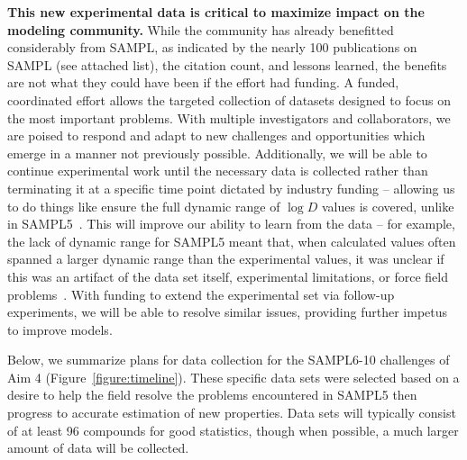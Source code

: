 \documentclass[11pt]{article}
\begin{document}
\textbf{This new experimental data is critical to maximize impact on the modeling community.} 
While the community has already benefitted considerably from SAMPL, as indicated by the nearly 100 publications on SAMPL (see attached list), the citation count, and lessons learned, the benefits are not what they could have been if the effort had funding.
A funded, coordinated effort allows the targeted collection of datasets designed to focus on the most important problems. 
With multiple investigators and collaborators, we are poised to respond and adapt to new challenges and opportunities which emerge in a manner not previously possible.
Additionally, we will be able to continue experimental work until the necessary data is collected rather than terminating it at a specific time point dictated by industry funding -- allowing us to do things like ensure the full dynamic range of $\log D$ values is covered, unlike in SAMPL5~\cite{rustenburg_measuring_2016, bannan_blind_2016}.
This will improve our ability to learn from the data -- for example, the lack of dynamic range for SAMPL5 meant that, when calculated values often spanned a larger dynamic range than the experimental values, it was unclear if this was an artifact of the data set itself, experimental limitations, or force field problems~\cite{rustenburg_measuring_2016, bannan_blind_2016, paranahewage_predicting_2016, klamt_prediction_2016}. 
With funding to extend the experimental set via follow-up experiments, we will be able to resolve similar issues, providing further impetus to improve models.


Below, we summarize plans for data collection for the SAMPL6-10 challenges of Aim 4 (Figure~\ref{figure:timeline}).
These specific data sets were selected based on a desire to help the field resolve the problems encountered in SAMPL5 then progress to accurate estimation of new properties.
Data sets will typically consist of at least 96 compounds for good statistics, though when possible, a much larger amount of data will be collected.
\end{document}
